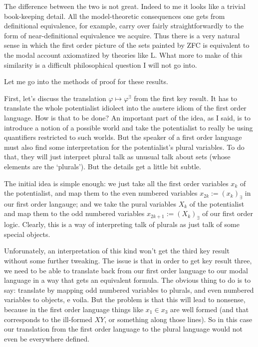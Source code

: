 \documentclass{article}
\begin{document}
The difference between the two is not great. 
Indeed to me it looks like a trivial book-keeping detail. 
All the model-theoretic consequences one gets 
from definitional equivalence, for example, carry over fairly straightforwardly to the form of 
near-definitional equivalence we acquire. Thus there is a very natural sense in which the first order 
picture of the sets painted by ZFC is equivalent to the modal account axiomatized by theories like L. 
What more to make of this similarity is a difficult philosophical question I will not go into.

Let me go into the methods of proof for these results. 

First, let's discuss the translation $\varphi \mapsto \varphi^\exists$ from the first key result.
It has to translate the whole potentialist idiolect into the austere idiom of the 
first order language. How is that to be done? An important part of the idea, as I said, is to introduce a
notion of a possible world and take the potentialist to really be using quantifiers 
restricted to such worlds. But the speaker of a first order language must also 
find some interpretation for the potentialist's plural variables. To do that, 
they will just interpret plural talk as unusual talk about sets (whose elements 
are the `plurals'). But the details get a little bit subtle.

The initial idea is simple enough: we just take all the first order variables $x_k$ of the potentialist, and 
map them to the even numbered variables $x_{2k} := (x_k)_\exists$ in our first order langauge; 
and we take the pural variables $X_k$ of the 
potentialist and map them to the odd numbered variables $x_{2k+1} := (X_k)_\exists$ 
of our first order logic. Clearly, this is a way of interpreting talk of 
plurals as just talk of some special objects.

Unforunately, an interpretation of this kind won't get the third key result 
without some further tweaking. The issue is that in order to get key result three, 
we need to be able to translate back from our first order language to 
our modal language in a way that gets an equivalent formula. The obvious thing to do 
is to say: translate by mapping odd numbered variables to plurals, and even numbered 
variables to objects, e voila. But the problem is that this will lead to nonsense, 
because in the first order language things like $x_1 \in x_3$ are well formed (and that 
corresponds to the ill-formed $XY$, or something along those lines). So in this 
case our translation from the first order language to the plural language would 
not even be everywhere defined.
\end{document}
